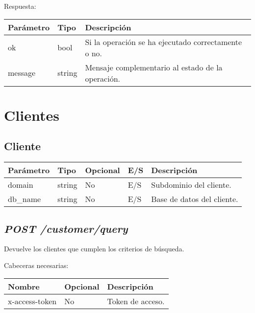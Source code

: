 Respuesta:
\begin{table}[!h]
	\centering
	\begin{adjustbox}{max width=\textwidth}
	\begin{tabular}{|l|l|l|}
		\hline
		Parámetro & Tipo & Descripción \\ \hline
		ok & bool & Si la operación se ha ejecutado correctamente o no. \\ \hline
		message & string & Mensaje complementario al estado de la operación. \\ \hline
	\end{tabular}
\end{adjustbox}
\end{table}




\section{Clientes}

\subsection{Cliente}
\begin{table}[!h]
	\centering
	\begin{adjustbox}{max width=\textwidth}
	\begin{tabular}{|l|l|l|l|l|}
		\hline
		Parámetro & Tipo & Opcional & E/S & Descripción \\ \hline
		domain & string & No & E/S & Subdominio del cliente. \\ \hline
		db\_name & string & No & E/S & Base de datos del cliente. \\ \hline
	\end{tabular}
\end{adjustbox}
\end{table}


\subsection{\textit{POST /customer/query}}
Devuelve los clientes que cumplen los criterios de búsqueda.

Cabeceras necesarias:
\begin{table}[h!]
	\centering
	\begin{adjustbox}{max width=\textwidth}
	\begin{tabular}{|l|l|l|}
		\hline
		Nombre & Opcional & Descripción \\ \hline
		x-access-token & No & Token de acceso. \\ \hline
	\end{tabular}
\end{adjustbox}
\end{table}

